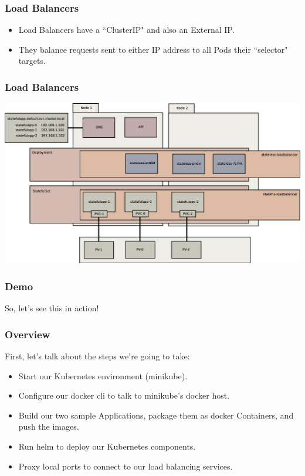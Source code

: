 \documentclass{beamer}
\begin{document}
\begin{frame}
    \frametitle{Load Balancers}
    \begin{itemize}
        \item Load Balancers have a ``ClusterIP" and also an External IP.
        \item They balance requests sent to either IP address to all Pods their ``selector" targets.
    \end{itemize}
\end{frame}

\begin{frame}
    \frametitle{Load Balancers}
    \includegraphics[width=\textwidth,height=0.85\textheight,keepaspectratio]{graphics/08-loadBalancer.eps}
\end{frame}

\begin{frame}
    \frametitle{Demo}
    \begin{center}
        \Huge So, let's see this in action!
    \end{center}
\end{frame}

\begin{frame}
    \frametitle{Overview}
    First, let's talk about the steps we're going to take:
    \begin{itemize}
        \item Start our Kubernetes environment (minikube).
        \item Configure our docker cli to talk to minikube's docker host.
        \item Build our two sample Applications, package them as docker Containers, and push the images.
        \item Run helm to deploy our Kubernetes components.
        \item Proxy local ports to connect to our load balancing services.
    \end{itemize}
\end{frame}
\end{document}
